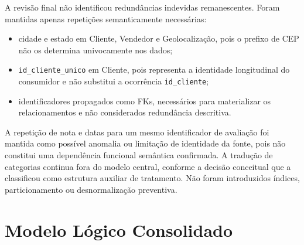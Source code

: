 \documentclass[12pt,a4paper]{article}
\begin{document}
	A revisão final não identificou redundâncias indevidas remanescentes. Foram
	mantidas apenas repetições semanticamente necessárias:

	\begin{itemize}[leftmargin=1.2cm]
		\item cidade e estado em Cliente, Vendedor e Geolocalização, pois o prefixo de
		CEP não os determina univocamente nos dados;
		\item \texttt{id\_cliente\_unico} em Cliente, pois representa a identidade
		longitudinal do consumidor e não substitui a ocorrência \texttt{id\_cliente};
		\item identificadores propagados como FKs, necessários para materializar os
		relacionamentos e não considerados redundância descritiva.
	\end{itemize}

	A repetição de nota e datas para um mesmo identificador de avaliação foi
	mantida como possível anomalia ou limitação de identidade da fonte, pois não
	constitui uma dependência funcional semântica confirmada. A tradução de
	categorias continua fora do modelo central, conforme
	a decisão conceitual que a classificou como estrutura auxiliar de tratamento.
	Não foram introduzidos índices, particionamento ou desnormalização preventiva.

	\section{Modelo Lógico Consolidado}
\end{document}
